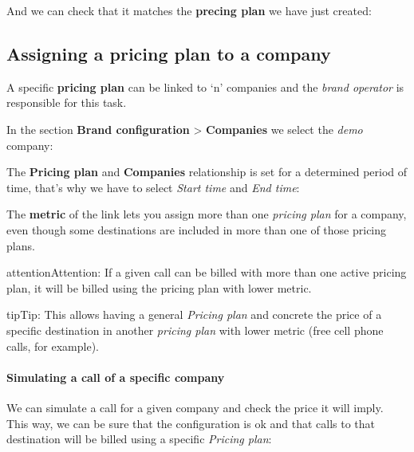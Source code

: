 \documentclass[letterpaper,10pt,english]{sphinxmanual}
\begin{document}
\noindent{}

And we can check that it matches the \textbf{precing plan} we have just created:

\noindent{}


\subsection{Assigning a pricing plan to a company}
\label{external_outgoing_calls/noplan_nocall:assigning-a-pricing-plan-to-a-company}\label{external_outgoing_calls/noplan_nocall:pricing-plan-to-company}
A specific \textbf{pricing plan} can be linked to `n' companies and the \emph{brand
operator} is responsible for this task.

In the section \textbf{Brand configuration} \textgreater{} \textbf{Companies} we select the \emph{demo}
company:

\noindent{}

The \textbf{Pricing plan} and \textbf{Companies} relationship is set for a determined
period of time, that's why we have to select \emph{Start time} and \emph{End time}:

\noindent{}

The \textbf{metric} of the link lets you assign more than one \emph{pricing plan} for a
company, even though some destinations are included in more than one of those
pricing plans.

\begin{notice}{attention}{Attention:}
If a given call can be billed with more than one active pricing
plan, it will be billed using the pricing plan with lower metric.
\end{notice}

\begin{notice}{tip}{Tip:}
This allows having a general \emph{Pricing plan} and concrete the price of
a specific destination in another \emph{pricing plan} with lower metric (free cell
phone calls, for example).
\end{notice}
\paragraph{Simulating a call of a specific company}

We can simulate a call for a given company and check the price it will imply.
This way, we can be sure that the configuration is ok and that calls to that
destination will be billed using a specific \emph{Pricing plan}:
\end{document}
